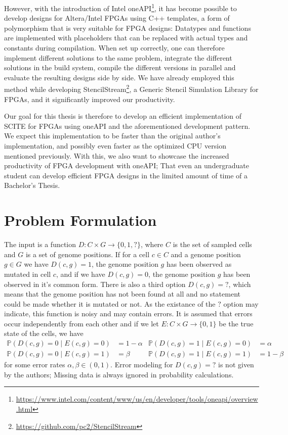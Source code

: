 However, with the introduction of Intel oneAPI\footnote{\url{https://www.intel.com/content/www/us/en/developer/tools/oneapi/overview.html}}, it has become possible to develop designs for Altera/Intel \acp{FPGA} using C++ templates, a form of polymorphism that is very suitable for \ac{FPGA} designs: Datatypes and functions are implemented with placeholders that can be replaced with actual types and constants during compilation. When set up correctly, one can therefore implement different solutions to the same problem, integrate the different solutions in the build system, compile the different versions in parallel and evaluate the resulting designs side by side. We have already employed this method while developing StencilStream\footnote{\url{https://github.com/pc2/StencilStream}}, a Generic Stencil Simulation Library for \acp{FPGA}, and it significantly improved our productivity.

Our goal for this thesis is therefore to develop an efficient implementation of SCITE for \acp{FPGA} using oneAPI and the aforementioned development pattern. We expect this implementation to be faster than the original author's implementation, and possibly even faster as the optimized CPU version mentioned previously. With this, we also want to showcase the increased productivity of \ac{FPGA} development with oneAPI; That even an undergraduate student can develop efficient FPGA designs in the limited amount of time of a Bachelor's Thesis.

\section{Problem Formulation}

The input is a function $D: C \times G \rightarrow \{0, 1, ?\}$, where $C$ is the set of sampled cells and $G$ is a set of genome positions. If for a cell $c \in C$ and a genome position $g \in G$ we have $D(c, g) = 1$, the genome position $g$ has been observed as mutated in cell $c$, and if we have $D(c, g) = 0$, the genome position $g$ has been observed in it's common form. There is also a third option $D(c, g) = ?$, which means that the genome position has not been found at all and no statement could be made whether it is mutated or not. As the existance of the $?$ option may indicate, this function is noisy and may contain errors. It is assumed that errors occur independently from each other and if we let $E: C \times G \rightarrow \{0, 1\}$ be the true state of the cells, we have
\begin{align*}
    \mathbb{P}(D(c, g) = 0 \mid E(c, g) = 0) &= 1 - \alpha & \mathbb{P}(D(c, g) = 1 \mid E(c, g) = 0) &= \alpha \\
    \mathbb{P}(D(c, g) = 0 \mid E(c, g) = 1) &= \beta & \mathbb{P}(D(c, g) = 1 \mid E(c, g) = 1) &= 1 - \beta
\end{align*}
for some error rates $\alpha, \beta \in (0, 1)$. Error modeling for $D(c, g) = ?$ is not given by the authors; Missing data is always ignored in probability calculations.

